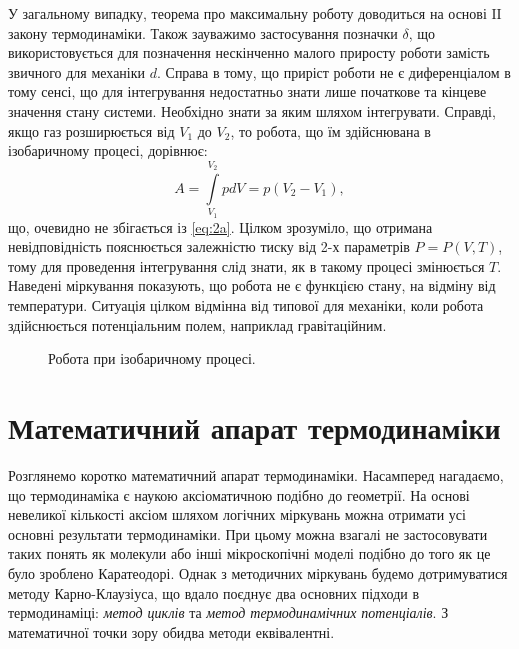

У загальному випадку, теорема про максимальну роботу доводиться на основі ΙΙ закону термодинаміки. Також зауважимо застосування позначки $\delta$, що використовується для позначення нескінченно малого приросту роботи замість звичного для механіки $d$. Справа в тому, що приріст роботи не є диференціалом в тому сенсі, що для інтегрування недостатньо знати лише початкове та кінцеве значення стану системи. Необхідно знати за яким шляхом інтегрувати. Справді, якщо газ розширюється від $V_1$ до $V_2$, то робота, що їм здійснювана в ізобаричному процесі, дорівнює:
\begin{equation*}\tag{2б}
    A = \int\limits_{V_1}^{V_2} p dV = p(V_2 - V_1),
\end{equation*}
що, очевидно не збігається із \eqref{eq:2a}. Цілком зрозуміло, що отримана невідповідність пояснюється залежністю тиску від 2-х параметрів $P=P(V,T)$, тому для проведення інтегрування слід знати, як в такому процесі змінюється $T$. Наведені міркування показують, що робота не є функцією стану, на відміну від температури. Ситуація цілком відмінна від типової для механіки, коли робота здійснюється  потенціальним полем, наприклад гравітаційним.


\begin{figure}
\begin{center}

\end{center}
\caption{Робота при ізобаричному процесі.}\label{pic:isobaric}
\end{figure}



\section{Математичний апарат термодинаміки}




Розглянемо коротко математичний апарат термодинаміки. Насамперед нагадаємо, що термодинаміка є наукою аксіоматичною подібно до геометрії. На основі невеликої кількості аксіом шляхом логічних міркувань можна отримати усі основні результати термодинаміки. При цьому можна взагалі не застосовувати таких понять як молекули або інші мікроскопічні моделі подібно до того як це було зроблено Каратеодорі. Однак з методичних міркувань будемо дотримуватися методу Карно-Клаузіуса, що вдало поєднує два основних підходи в термодинаміці: \emph{метод циклів} та \emph{метод термодинамічних потенціалів}. З математичної точки зору обидва методи еквівалентні.


